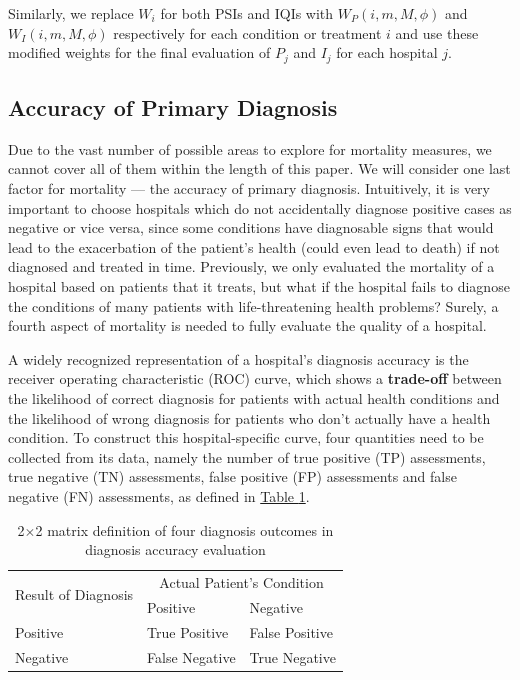\documentclass{article}
\begin{document}
Similarly, we replace $W_i$ for both PSIs and IQIs with $W_P\left(i,m,M,\phi\right)$ and $W_I\left(i,m,M,\phi\right)$ respectively for each condition or treatment $i$ and use these modified weights for the final evaluation of $P_j$ and $I_j$ for each hospital $j$.

\subsection{Accuracy of Primary Diagnosis}

Due to the vast number of possible areas to explore for mortality measures, we cannot cover all of them within the length of this paper. We will consider one last factor for mortality --- the accuracy of primary diagnosis. Intuitively, it is very important to choose hospitals which do not accidentally diagnose positive cases as negative or vice versa, since some conditions have diagnosable signs that would lead to the exacerbation of the patient's health (could even lead to death) if not diagnosed and treated in time. Previously, we only evaluated the mortality of a hospital based on patients that it treats, but what if the hospital fails to diagnose the conditions of many patients with life-threatening health problems? Surely, a fourth aspect of mortality is needed to fully evaluate the quality of a hospital.

A widely recognized representation of a hospital's diagnosis accuracy is the receiver operating characteristic (ROC) curve, which shows a \textbf{trade-off} between the likelihood of correct diagnosis for patients with actual health conditions and the likelihood of wrong diagnosis for patients who don't actually have a health condition. To construct this hospital-specific curve, four quantities need to be collected from its data, namely the number of true positive (TP) assessments, true negative (TN) assessments, false positive (FP) assessments and false negative (FN) assessments, as defined in \hyperref[tab:diagnosis_matrix]{Table \ref*{tab:diagnosis_matrix}}.

{\renewcommand{\arraystretch}{1.8}%
\begin{table}[htbp]
    \centering
    \begin{tabular}{l|l|l}
        \toprule
        \multirow{ 2}{*}{Result of Diagnosis} & \multicolumn{2}{c}{Actual Patient's Condition} \\
        \cline{2-3}
        & Positive & Negative \\
        \hline
        Positive & True Positive & False Positive \\
        \hline
        Negative & False Negative & True Negative \\
        \bottomrule
    \end{tabular}
    \caption{2$\times$2 matrix definition of four diagnosis outcomes in diagnosis accuracy evaluation}
    \label{tab:diagnosis_matrix}
\end{table}
}
\end{document}
